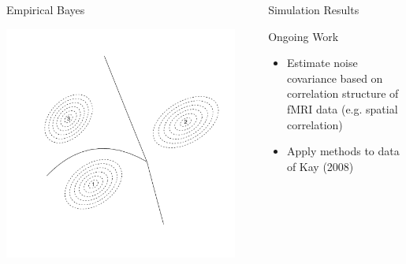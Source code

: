 \documentclass[final]{beamer}
\newlength{\sepwid}
\newlength{\onecolwid}
\begin{document}
\begin{frame}[t]
\begin{columns}[t]
\begin{column}{\onecolwid}
\begin{block}{Empirical Bayes}
\begin{center}
\includegraphics[scale = 1.0]{illus1_B.pdf}
\end{center}

\end{block}



\end{column} %

\begin{column}{\sepwid}\end{column} %

\begin{column}{\onecolwid} %


\begin{block}{Simulation Results}

\end{block}

\begin{block}{Ongoing Work}
\begin{itemize}
\item Estimate noise covariance based on correlation structure of fMRI data (e.g. spatial correlation)
\item Apply methods to data of Kay (2008)
\end{itemize}
\end{block}


\end{column}
\end{columns}
\end{frame}
\end{document}
